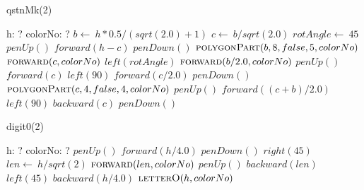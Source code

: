 \documentclass[a4paper,10pt]{article}
\begin{document}
\begin{algorithm}
\caption{qstnMk(2)}
\begin{algorithmic}[5]
\State {}
\State {}
    \State h: ?
    \State colorNo: ?
  \EndDecl
  \State \(b\gets\ h*0.5/(sqrt(2.0)+1)\)
  \State \(c\gets\ b/sqrt(2.0)\)
  \State \(rotAngle\gets\ 45\)
  \State \(penUp()\)
  \State \(forward(h-c)\)
  \State \(penDown()\)
  \State {}
  \State {}
  \State \(\Call{polygonPart}{b,8,false,5,colorNo}\)
  \State \(\Call{forward}{c,colorNo}\)
  \State \(left(rotAngle)\)
  \State \(\Call{forward}{b/2.0,colorNo}\)
  \State \(penUp()\)
  \State \(forward(c)\)
  \State \(left(90)\)
  \State \(forward(c/2.0)\)
  \State \(penDown()\)
  \State {}
  \State {}
  \State \(\Call{polygonPart}{c,4,false,4,colorNo}\)
  \State \(penUp()\)
  \State \(forward((c+b)/2.0)\)
  \State \(left(90)\)
  \State \(backward(c)\)
  \State \(penDown()\)
\EndProcedure
\end{algorithmic}
\end{algorithm}


\begin{algorithm}
\caption{digit0(2)}
\begin{algorithmic}[5]
\State {}
\State {}
    \State h: ?
    \State colorNo: ?
  \EndDecl
  \State \(penUp()\)
  \State \(forward(h/4.0)\)
  \State \(penDown()\)
  \State \(right(45)\)
  \State \(len\gets\ h/sqrt(2)\)
  \State \(\Call{forward}{len,colorNo}\)
  \State \(penUp()\)
  \State \(backward(len)\)
  \State \(left(45)\)
  \State \(backward(h/4.0)\)
  \State \(\Call{letterO}{h,colorNo}\)
\EndProcedure
\end{algorithmic}
\end{algorithm}
\end{document}
